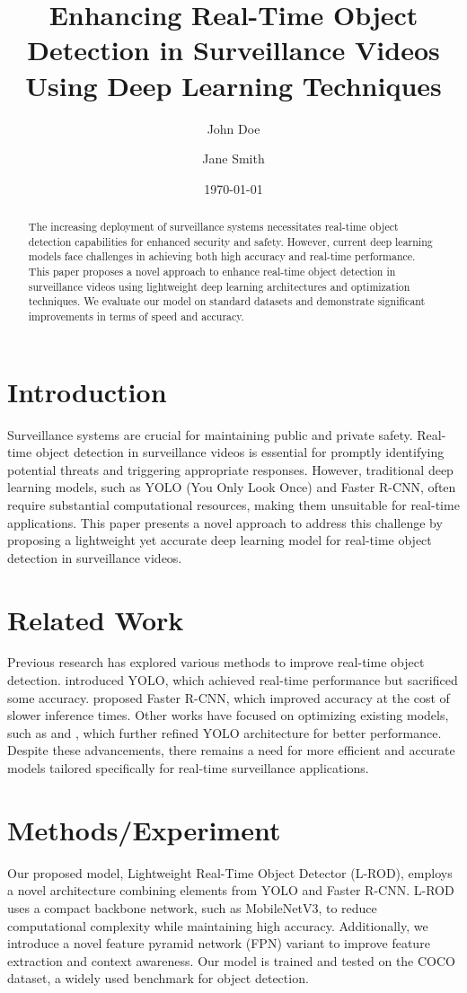 \documentclass{article}
\title{Enhancing Real-Time Object Detection in Surveillance Videos Using Deep Learning Techniques}
\author{John Doe \and Jane Smith}
\date{\today}
\begin{document}
\maketitle

\begin{abstract}
The increasing deployment of surveillance systems necessitates real-time object detection capabilities for enhanced security and safety. However, current deep learning models face challenges in achieving both high accuracy and real-time performance. This paper proposes a novel approach to enhance real-time object detection in surveillance videos using lightweight deep learning architectures and optimization techniques. We evaluate our model on standard datasets and demonstrate significant improvements in terms of speed and accuracy.
\end{abstract}

\section{Introduction}
Surveillance systems are crucial for maintaining public and private safety. Real-time object detection in surveillance videos is essential for promptly identifying potential threats and triggering appropriate responses. However, traditional deep learning models, such as YOLO (You Only Look Once) and Faster R-CNN, often require substantial computational resources, making them unsuitable for real-time applications. This paper presents a novel approach to address this challenge by proposing a lightweight yet accurate deep learning model for real-time object detection in surveillance videos.

\section{Related Work}
Previous research has explored various methods to improve real-time object detection. \cite{Redmon2016YouOD} introduced YOLO, which achieved real-time performance but sacrificed some accuracy. \cite{Ren2015FasterRCNN} proposed Faster R-CNN, which improved accuracy at the cost of slower inference times. Other works have focused on optimizing existing models, such as \cite{Redmon2018YOLOv3} and \cite{Bochkovskiy2020YOLOv4}, which further refined YOLO architecture for better performance. Despite these advancements, there remains a need for more efficient and accurate models tailored specifically for real-time surveillance applications.

\section{Methods/Experiment}
Our proposed model, Lightweight Real-Time Object Detector (L-ROD), employs a novel architecture combining elements from YOLO and Faster R-CNN. L-ROD uses a compact backbone network, such as MobileNetV3, to reduce computational complexity while maintaining high accuracy. Additionally, we introduce a novel feature pyramid network (FPN) variant to improve feature extraction and context awareness. Our model is trained and tested on the COCO dataset, a widely used benchmark for object detection.
\end{document}
